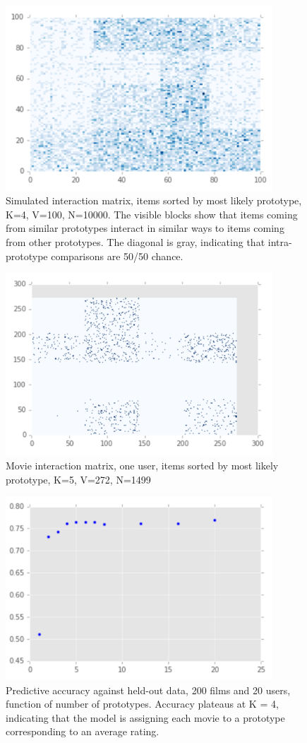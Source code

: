\begin{figure}
\centering
\includegraphics[width=10cm]{images/interactions_med}
\caption{Simulated interaction matrix, items sorted by most likely prototype, K=4, V=100, N=10000. The visible blocks show that items coming from similar prototypes interact in similar ways to items coming from other prototypes. The diagonal is gray, indicating that intra-prototype comparisons are 50/50 chance.}
\label{fig:interactions_med} 
\end{figure}

\begin{figure}
\centering
\includegraphics[width=10cm]{images/interactions_movie}
\caption{Movie interaction matrix, one user, items sorted by most likely prototype, K=5, V=272, N=1499}
\label{fig:interactions_movie} 
\end{figure}

\begin{figure}
\centering
\includegraphics[width=10cm]{images/acc_movies}
\caption{Predictive accuracy against held-out data, 200 films and 20 users, function of number of prototypes. Accuracy plateaus at K = 4, indicating that the model is assigning each movie to a prototype corresponding to an average rating.}
\label{fig:acc_movies} 
\end{figure}

